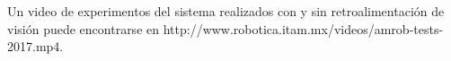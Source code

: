 \documentclass[twocolumn,10pt]{amrob}
\begin{document}
Un video de experimentos del sistema realizados con y sin retroalimentación de visión puede encontrarse en http://www.robotica.itam.mx/videos/amrob-tests-2017.mp4.





\end{document}
